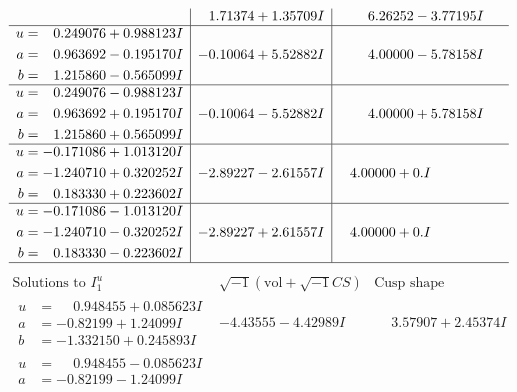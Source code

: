 \documentclass[1p]{elsarticle_modified}
\theoremstyle{definition}
\newcommand{\I}{\sqrt{-1}}
\begin{document}
$$\begin{array}{c|c|c}
 & \phantom{-}1.71374 + 1.35709 I & \phantom{-}6.26252 - 3.77195 I \\ \hline\begin{aligned}
u &= \phantom{-}0.249076 + 0.988123 I \\
a &= \phantom{-}0.963692 - 0.195170 I \\
b &= \phantom{-}1.215860 - 0.565099 I\end{aligned}
 & -0.10064 + 5.52882 I & \phantom{-}4.00000 - 5.78158 I \\ \hline\begin{aligned}
u &= \phantom{-}0.249076 - 0.988123 I \\
a &= \phantom{-}0.963692 + 0.195170 I \\
b &= \phantom{-}1.215860 + 0.565099 I\end{aligned}
 & -0.10064 - 5.52882 I & \phantom{-}4.00000 + 5.78158 I \\ \hline\begin{aligned}
u &= -0.171086 + 1.013120 I \\
a &= -1.240710 + 0.320252 I \\
b &= \phantom{-}0.183330 + 0.223602 I\end{aligned}
 & -2.89227 - 2.61557 I & \phantom{-}4.00000 + 0. I\phantom{ +0.000000I} \\ \hline\begin{aligned}
u &= -0.171086 - 1.013120 I \\
a &= -1.240710 - 0.320252 I \\
b &= \phantom{-}0.183330 - 0.223602 I\end{aligned}
 & -2.89227 + 2.61557 I & \phantom{-}4.00000 + 0. I\phantom{ +0.000000I}\\
 \hline 
 \end{array}$$\newpage$$\begin{array}{c|c|c}  
\text{Solutions to }I^u_{1}& \I (\text{vol} + \sqrt{-1}CS) & \text{Cusp shape}\\
 \hline 
\begin{aligned}
u &= \phantom{-}0.948455 + 0.085623 I \\
a &= -0.82199 + 1.24099 I \\
b &= -1.332150 + 0.245893 I\end{aligned}
 & -4.43555 - 4.42989 I & \phantom{-}3.57907 + 2.45374 I \\ \hline\begin{aligned}
u &= \phantom{-}0.948455 - 0.085623 I \\
a &= -0.82199 - 1.24099 I \\

\end{aligned}
\end{array}$$
\end{document}

